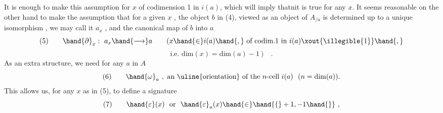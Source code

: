 It is enough to make this assumption for $x$ of codimension 1 in $i(a)$,
which will imply thatnit is true for any $x$.  It seems reasonable on the
other hand to make the assumption that for a given $x$ ,  the object  $b$
in (4),  viewed as an object of  $A_{/a}$ \hand{,}  is determined up to a unique
isomorphism ,  we may call it $a_{x}$ ,  and  the canonical map of $b$ into $a$
\[ (5) \qquad \hand{\partial}_{x} :\ a_{x} \hand{\longrightarrow} a \qquad ( x \hand{\in} i(a)\hand{,} \text{ of codim.1 in } i(a)\xout{\illegible{1}}\hand{,} \]
\[ \text{i.e. } \mathrm{dim}(x)=\mathrm{dim}(a)-1 \ ) \quad . \]
As an extra structure,  we need for any $a$ in $A$
\[ (6) \qquad \hand{\omega}_{a} \ ,\ \text{an \uline{orientation} of the $n$-cell } i(a) \ \ (n=\mathrm{dim}(a)). \]
This allows us,  for any $x$ as in (5),  to define a signature
\[ (7) \qquad \hand{\varepsilon}(x) \ \text{ or } \ \hand{\varepsilon}_{a}(x) \hand{\in} \hand{\{} +1,-1 \hand{\}} \ , \]

